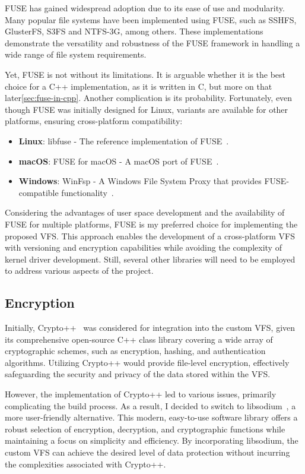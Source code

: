 FUSE has gained widespread adoption due to its ease of use and modularity.
Many popular file systems have been implemented using FUSE, such as SSHFS, GlusterFS, S3FS and NTFS-3G, among others.
These implementations demonstrate the versatility and robustness of the FUSE framework in handling a wide range of file system requirements.

Yet, FUSE is not without its limitations.
It is arguable whether it is the best choice for a C++ implementation, as it is written in C, but more on that later\ref{sec:fuse-in-cpp}.
Another complication is its probability.
Fortunately, even though FUSE was initially designed for Linux, variants are available for other platforms, ensuring cross-platform compatibility:

\begin{itemize}
    \item \textbf{Linux}: libfuse - The reference implementation of FUSE~\cite{libfuse}.
    \item \textbf{macOS}: FUSE for macOS - A macOS port of FUSE~\cite{osxfuse}.
    \item \textbf{Windows}: WinFsp - A Windows File System Proxy that provides FUSE-compatible functionality~\cite{winfsp}.
\end{itemize}

Considering the advantages of user space development and the availability of FUSE for multiple platforms, FUSE is my preferred choice for implementing the proposed VFS\@.
This approach enables the development of a cross-platform VFS with versioning and encryption capabilities while avoiding the complexity of kernel driver development.
Still, several other libraries will need to be employed to address various aspects of the project.

\subsection{Encryption}\label{subsec:encryption-analysis}

Initially, Crypto++~\cite{crypto_pp} was considered for integration into the custom VFS, given its comprehensive open-source C++ class library covering a wide array of cryptographic schemes, such as encryption, hashing, and authentication algorithms.
Utilizing Crypto++ would provide file-level encryption, effectively safeguarding the security and privacy of the data stored within the VFS\@.

However, the implementation of Crypto++ led to various issues, primarily complicating the build process.
As a result, I decided to switch to libsodium~\cite{libsodium}, a more user-friendly alternative.
This modern, easy-to-use software library offers a robust selection of encryption, decryption, and cryptographic functions while maintaining a focus on simplicity and efficiency.
By incorporating libsodium, the custom VFS can achieve the desired level of data protection without incurring the complexities associated with Crypto++.

